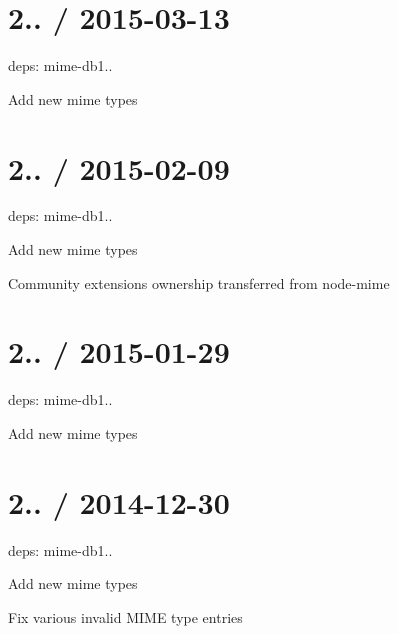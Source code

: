 \section*{2.. / 2015-\/03-\/13 }


\begin{DoxyItemize}
\item deps\+: mime-\/db1..
\begin{DoxyItemize}
\item Add new mime types
\end{DoxyItemize}
\end{DoxyItemize}

\section*{2.. / 2015-\/02-\/09 }


\begin{DoxyItemize}
\item deps\+: mime-\/db1..
\begin{DoxyItemize}
\item Add new mime types
\item Community extensions ownership transferred from {\ttfamily node-\/mime}
\end{DoxyItemize}
\end{DoxyItemize}

\section*{2.. / 2015-\/01-\/29 }


\begin{DoxyItemize}
\item deps\+: mime-\/db1..
\begin{DoxyItemize}
\item Add new mime types
\end{DoxyItemize}
\end{DoxyItemize}

\section*{2.. / 2014-\/12-\/30 }


\begin{DoxyItemize}
\item deps\+: mime-\/db1..
\begin{DoxyItemize}
\item Add new mime types
\item Fix various invalid M\+I\+ME type entries
\end{DoxyItemize}
\end{DoxyItemize}

